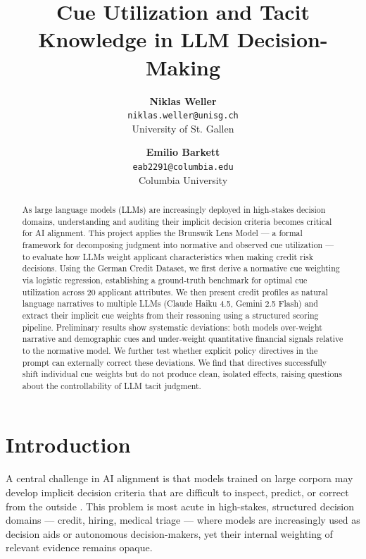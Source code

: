 \documentclass[midterm]{sparreport}
\title{Cue Utilization and Tacit Knowledge in LLM Decision-Making}
\author{
  \textbf{Niklas Weller}\\
  \texttt{niklas.weller@unisg.ch}\\
  University of St. Gallen
  \and
  \textbf{Emilio Barkett}\\
  \texttt{eab2291@columbia.edu}\\
  Columbia University
}
\begin{document}
\maketitle

\begin{abstract}
As large language models (LLMs) are increasingly deployed in high-stakes decision domains, understanding and auditing their implicit decision criteria becomes critical for AI alignment. This project applies the Brunswik Lens Model — a formal framework for decomposing judgment into normative and observed cue utilization — to evaluate how LLMs weight applicant characteristics when making credit risk decisions. Using the German Credit Dataset, we first derive a normative cue weighting via logistic regression, establishing a ground-truth benchmark for optimal cue utilization across 20 applicant attributes. We then present credit profiles as natural language narratives to multiple LLMs (Claude Haiku 4.5, Gemini 2.5 Flash) and extract their implicit cue weights from their reasoning using a structured scoring pipeline. Preliminary results show systematic deviations: both models over-weight narrative and demographic cues and under-weight quantitative financial signals relative to the normative model. We further test whether explicit policy directives in the prompt can externally correct these deviations. We find that directives successfully shift individual cue weights but do not produce clean, isolated effects, raising questions about the controllability of LLM tacit judgment.
\end{abstract}


\section{Introduction}

A central challenge in AI alignment is that models trained on large corpora may develop implicit decision criteria that are difficult to inspect, predict, or correct from the outside \citep{doshi2017interpretability}. This problem is most acute in high-stakes, structured decision domains — credit, hiring, medical triage — where models are increasingly used as decision aids or autonomous decision-makers, yet their internal weighting of relevant evidence remains opaque.
\end{document}
